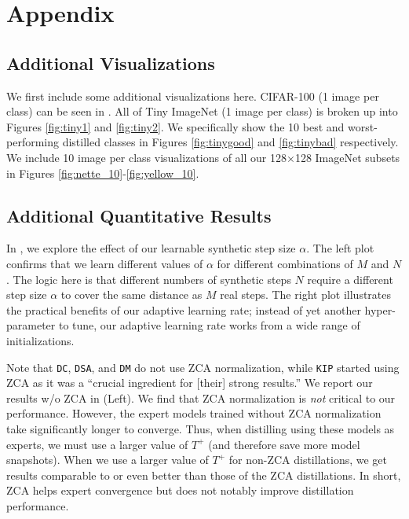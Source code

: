 \documentclass[main.tex]{subfiles}
\begin{document}
\section{Appendix}\subsection{Additional Visualizations}
We first include some additional visualizations here. CIFAR-100 (1 image per class) can be seen in . 
All of Tiny ImageNet (1 image per class) is broken up into Figures \ref{fig:tiny1} and \ref{fig:tiny2}. We specifically show the 10 best and worst-performing distilled classes in Figures \ref{fig:tinygood} and \ref{fig:tinybad} respectively.
We include 10 image per class visualizations of all our 128$\times$128 ImageNet subsets in Figures \ref{fig:nette_10}-\ref{fig:yellow_10}.



\subsection{Additional Quantitative Results}


In , we explore the effect of our learnable synthetic step size $\alpha$. The left plot confirms that we learn different values of $\alpha$ for different combinations of $M$ and $N$. The logic here is that different numbers of synthetic steps $N$ require a different step size $\alpha$ to cover the same distance as $M$ real steps. The right plot illustrates the practical benefits of our adaptive learning rate; instead of yet another hyper-parameter to tune, our adaptive learning rate works from a wide range of initializations.



Note that \texttt{DC}, \texttt{DSA}, and \texttt{DM} do not use ZCA normalization, while \texttt{KIP} started using ZCA as it was a ``crucial ingredient for [their] strong results.'' We report our results w/o ZCA in  (Left).
We find that ZCA normalization is \textit{not} critical to our performance. 
However, the expert models trained without ZCA normalization take significantly longer to converge. Thus, when distilling using these models as experts, we must use a larger value of $T^+$ (and therefore save more model snapshots). When we use a larger value of $T^+$ for non-ZCA distillations, we get results comparable to or even better than those of the ZCA distillations.  
In short, ZCA helps expert convergence but does not notably improve distillation performance. 
\end{document}
